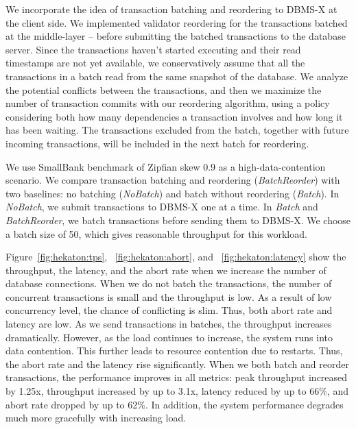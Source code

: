 We incorporate the idea of transaction batching and reordering to DBMS-X at the client side.
We implemented validator reordering for the transactions batched at the middle-layer -- before submitting the batched transactions to the database server. Since the transactions haven't started executing and their read timestamps are not yet available, we conservatively assume that all the transactions in a batch read from the same snapshot of the database. We analyze the potential conflicts between the transactions, and then we maximize the number of transaction commits with our reordering algorithm, using a policy considering both how many dependencies a transaction involves and how long it has been waiting. The transactions excluded from the batch, together with future incoming transactions, will be included in the next batch for reordering.

We use SmallBank benchmark of Zipfian skew 0.9 as a high-data-contention scenario. We compare transaction batching and reordering (\emph{BatchReorder}) with two baselines: no batching (\emph{NoBatch}) and batch without reordering (\emph{Batch}). In \emph{NoBatch}, we submit transactions to DBMS-X one at a time. In \emph{Batch} and \emph{BatchReorder}, we batch transactions before sending them to DBMS-X. We choose a batch size of 50, which gives reasonable throughput for this workload.

Figure~\ref{fig:hekaton:tps}, ~\ref{fig:hekaton:abort}, and ~\ref{fig:hekaton:latency} show the throughput, the latency, and the abort rate when we increase the number of database connections. When we do not batch the transactions, the number of concurrent transactions is small and the throughput is low. As a result of low concurrency level, the chance of conflicting is slim. Thus, both abort rate and latency are low. As we send transactions in batches, the throughput increases dramatically. However, as the load continues to increase, the system runs into data contention. This further leads to resource contention due to restarts. Thus, the abort rate and the latency rise significantly. When we both batch and reorder transactions, the performance improves in all metrics: peak throughput increased by 1.25x, throughput increased by up to 3.1x, latency reduced by up to 66\%, and abort rate dropped by up to 62\%. In addition, the system performance degrades much more gracefully with increasing load.
